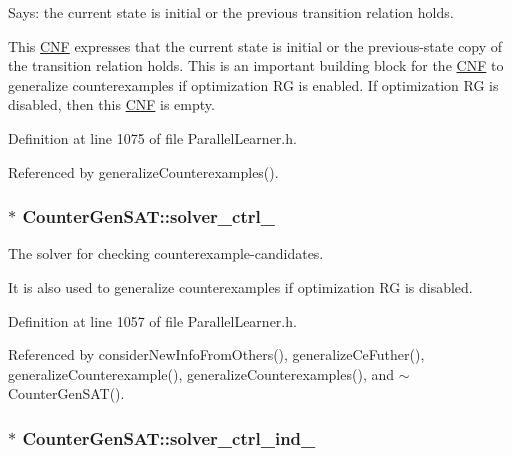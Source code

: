 Says\-: the current state is initial or the previous transition relation holds. 

This \hyperlink{classCNF}{C\-N\-F} expresses that the current state is initial or the previous-\/state copy of the transition relation holds. This is an important building block for the \hyperlink{classCNF}{C\-N\-F} to generalize counterexamples if optimization R\-G is enabled. If optimization R\-G is disabled, then this \hyperlink{classCNF}{C\-N\-F} is empty. 

Definition at line 1075 of file Parallel\-Learner.\-h.



Referenced by generalize\-Counterexamples().

\hypertarget{classCounterGenSAT_a8ed22d7411e62b13c50824664e58807a}{
\subsubsection[{solver\-\_\-ctrl\-\_\-}]{$\ast$ Counter\-Gen\-S\-A\-T\-::solver\-\_\-ctrl\-\_\-\hspace{0.3cm}{\ttfamily [protected]}}}\label{classCounterGenSAT_a8ed22d7411e62b13c50824664e58807a}


The solver for checking counterexample-\/candidates. 

It is also used to generalize counterexamples if optimization R\-G is disabled. 

Definition at line 1057 of file Parallel\-Learner.\-h.



Referenced by consider\-New\-Info\-From\-Others(), generalize\-Ce\-Futher(), generalize\-Counterexample(), generalize\-Counterexamples(), and $\sim$\-Counter\-Gen\-S\-A\-T().

\hypertarget{classCounterGenSAT_a33c1b5637bdd766a7d2b8ff2e3147eca}{
\subsubsection[{solver\-\_\-ctrl\-\_\-ind\-\_\-}]{$\ast$ Counter\-Gen\-S\-A\-T\-::solver\-\_\-ctrl\-\_\-ind\-\_\-\hspace{0.3cm}{\ttfamily [protected]}}}\label{classCounterGenSAT_a33c1b5637bdd766a7d2b8ff2e3147eca}


